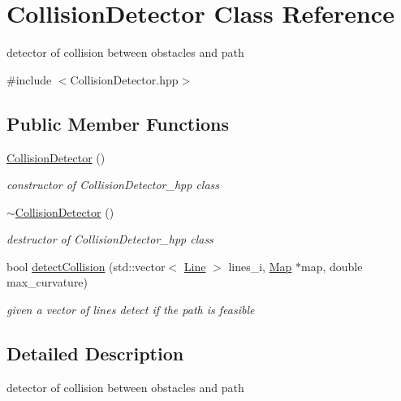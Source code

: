 \hypertarget{class_collision_detector}{}\section{Collision\+Detector Class Reference}
\label{class_collision_detector}


detector of collision between obstacles and path  




{\ttfamily \#include $<$Collision\+Detector.\+hpp$>$}

\subsection*{Public Member Functions}
\begin{DoxyCompactItemize}
\item 
\mbox{\label{class_collision_detector_ab3f66bd8d272a21674e38bf46d4d31e0}} 
\mbox{\hyperlink{class_collision_detector_ab3f66bd8d272a21674e38bf46d4d31e0}{Collision\+Detector}} ()
\begin{DoxyCompactList}\small\item\em constructor of Collision\+Detector\+\_\+hpp class \end{DoxyCompactList}\item 
\mbox{\label{class_collision_detector_a1a0f7a386920e0cf83a101be92f04598}} 
\mbox{\hyperlink{class_collision_detector_a1a0f7a386920e0cf83a101be92f04598}{$\sim$\+Collision\+Detector}} ()
\begin{DoxyCompactList}\small\item\em destructor of Collision\+Detector\+\_\+hpp class \end{DoxyCompactList}\item 
bool \mbox{\hyperlink{class_collision_detector_a190378f3f5714c8c75e5e5baabcfe2e7}{detect\+Collision}} (std\+::vector$<$ \mbox{\hyperlink{class_line}{Line}} $>$ lines\+\_\+i, \mbox{\hyperlink{class_map}{Map}} $\ast$map, double max\+\_\+curvature)
\begin{DoxyCompactList}\small\item\em given a vector of lines detect if the path is feasible \end{DoxyCompactList}\end{DoxyCompactItemize}


\subsection{Detailed Description}
detector of collision between obstacles and path 

